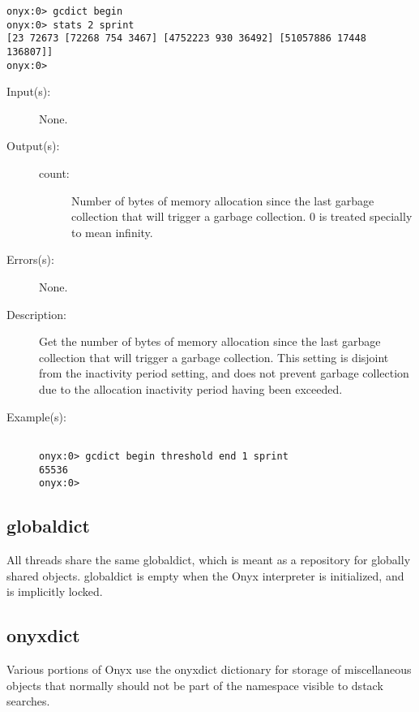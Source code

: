 \begin{description}
\begin{description}
\begin{verbatim}
onyx:0> gcdict begin
onyx:0> stats 2 sprint
[23 72673 [72268 754 3467] [4752223 930 36492] [51057886 17448 136807]]
onyx:0>
		\end{verbatim}
	\end{description}
\label{gcdict:threshold}
\item[{\onyxop{--}{threshold}{count}}: ]
	\begin{description}\item[]
	\item[Input(s): ] None.
	\item[Output(s): ]
		\begin{description}\item[]
		\item[count: ]
			Number of bytes of memory allocation since the last
			garbage collection that will trigger a garbage
			collection.  0 is treated specially to mean infinity.
		\end{description}
	\item[Errors(s): ] None.
	\item[Description: ]
		Get the number of bytes of memory allocation since the last
		garbage collection that will trigger a garbage collection.  This
		setting is disjoint from the inactivity period setting, and does
		not prevent garbage collection due to the allocation inactivity
		period having been exceeded.
	\item[Example(s): ]\begin{verbatim}

onyx:0> gcdict begin threshold end 1 sprint
65536
onyx:0>
		\end{verbatim}
	\end{description}
\end{description}

\subsection{globaldict}
\label{sec:globaldict}

All threads share the same globaldict, which is meant as a repository for
globally shared objects.  globaldict is empty when the Onyx interpreter is
initialized, and is implicitly locked.

\subsection{onyxdict}
\label{sec:onyxdict}

Various portions of Onyx use the onyxdict dictionary for storage of
miscellaneous objects that normally should not be part of the namespace visible
to dstack searches.

